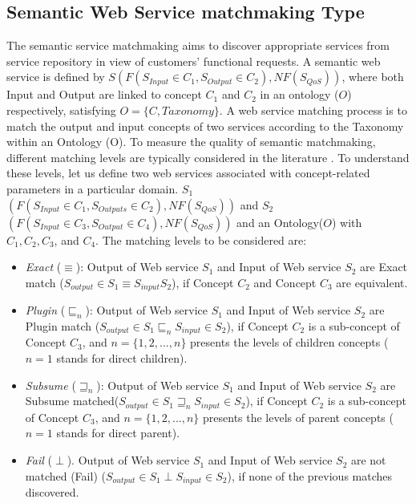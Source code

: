 \documentclass{llncs}
\begin{document}
\subsection{Semantic Web Service matchmaking Type}\label{semantic Web service Discovery}
The semantic service matchmaking aims to discover appropriate services from service repository in view of customers' functional requests. A semantic web service is defined by $S(F(S_{Input}\in C_{1}, S_{Output}\in C_{2}), NF(S_{QoS}))$, where both Input and Output are linked to concept $C_{1}$ and $C_{2}$ in an ontology ($O$) respectively, satisfying $O=\{C, Taxonomy\}$. A web service matching process is to match the output and input concepts of two services according to the Taxonomy within an Ontology (O). To measure the quality of semantic matchmaking, different matching levels are typically considered in the literature \cite{paolucci2002semantic}. To understand these levels, let us define two web services associated with concept-related parameters in a particular domain. $S_{1}$ $(F(S_{Input}\in C_{1}, S_{Outputs}\in C_{2}), NF(S_{QoS}))$ and  $S_{2}$ $(F(S_{Input}\in C_{3}, S_{Output}\in C_{4}), NF(S_{QoS}))$ and an Ontology($O$) with $C_{1},C_{2},C_{3}$, and $C_{4}$. The matching levels to be considered are:

\begin{itemize}
\item \textit{Exact} ($\equiv$): Output of Web service $S_{1}$ and Input of Web service $S_{2}$ are Exact match ($ S_{output} \in S_{1} \equiv S_{input}S_{2}$), if  Concept $C_{2}$ and Concept $C_{3}$ are equivalent.
\item \textit{Plugin} ($\sqsubseteq_{n}$): Output of Web service $S_{1}$ and Input of Web service $S_{2}$ are Plugin match ($S_{output} \in S_{1} \sqsubseteq_{n} S_{input} \in S_{2}$), if  Concept $C_{2}$ is a sub-concept of Concept $C_{3}$, and $n = \{1,2,...,n \}$ presents the levels of children concepts ($n=1$ stands for direct children).
\item \textit{Subsume} ($\sqsupseteq_{n}$): Output of Web service $S_{1}$ and Input of Web service $S_{2}$ are Subsume matched($S_{output} \in S_{1} \sqsupseteq_{n} S_{input} \in S_{2}$), if  Concept $C_{2}$ is a sub-concept of  Concept $C_{3}$, and $n = \{1,2,...,n \}$ presents the levels of parent concepts ($n=1$ stands for direct parent).
\item \textit{Fail} ($\perp$). Output of Web service $S_{1}$ and Input of Web service $S_{2}$ are not matched (Fail) ($S_{output} \in S_{1} \perp S_{input} \in S_{2}$), if none of the previous matches discovered.
\end{itemize}
\vspace{-0.5cm}
\end{document}
